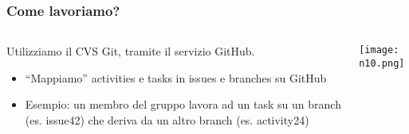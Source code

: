 \begin{frame}
\frametitle{Come lavoriamo?}
\begin{columns}
    \begin{column}{0.4\textwidth}
     \par
	Utilizziamo il CVS Git, tramite il servizio GitHub.\\
	\begin{itemize}
		\item ``Mappiamo'' activities e tasks in issues e branches su GitHub
		\item Esempio: un membro del gruppo lavora ad un task su un branch (es. issue42) che deriva da un altro branch (es. activity24)
	\end{itemize}
    \end{column}
    \begin{column}{0.4\textwidth}
     \texttt{[image: n10.png]}
    \end{column}
  \end{columns}
\end{frame}


